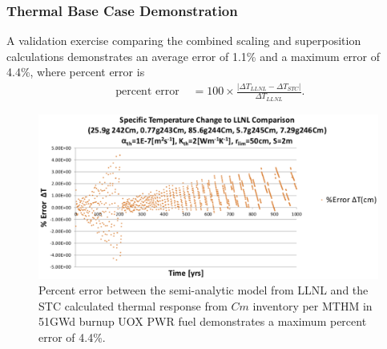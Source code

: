 \begin{frame}[ctb!]
  \frametitle{Thermal Base Case Demonstration}
A validation exercise comparing the combined scaling and  
superposition calculations demonstrates an average error of 1.1\% and a 
maximum error of 4.4\%, where percent error is 
\begin{align}
\mbox{ percent error } &= 100\times\frac{\left|\Delta T_{LLNL} - \Delta 
T_{STC}\right|}{ \Delta T_{LLNL}}.
\end{align}
\begin{figure}[htp!]
\begin{center}
\includegraphics[width=\columnwidth]{./thermal_demonstration/CmPercentError.eps}
\end{center}
\caption{Percent error between the semi-analytic model from LLNL and the 
STC 
calculated thermal response from $Cm$ inventory per MTHM in 51GWd burnup UOX 
PWR fuel demonstrates a maximum percent error of 4.4\%.}
\label{fig:CmPercentError}
\end{figure}
\end{frame}

